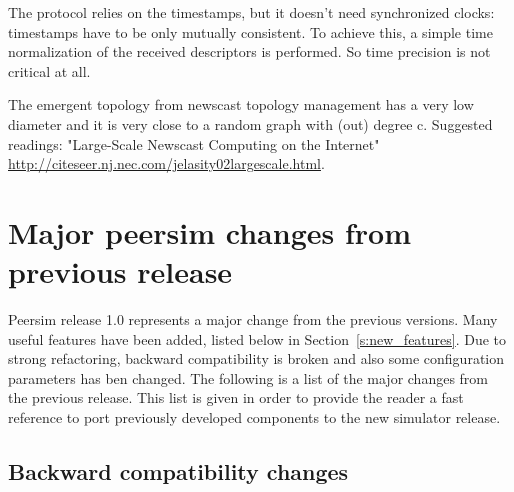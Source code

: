 \documentclass[a4paper,11pt]{article}
\begin{document}
The protocol relies on the timestamps, but it doesn't need synchronized
clocks: timestamps have to be only mutually consistent. To achieve
this, a simple time normalization of the received descriptors is performed.
So time precision is not critical at all. 

The emergent topology from newscast topology management has a very
low diameter and it is very close to a random graph with (out) degree
c. Suggested readings: "Large-Scale Newscast Computing on the Internet" \url{http://citeseer.nj.nec.com/jelasity02largescale.html}.

\section{\label{sec:Appendix-C-changes} Major peersim changes from
  previous release}

Peersim release 1.0 represents a major change from the previous
versions. 
Many useful features have been added, listed below in
Section~\ref{s:new_features}.    
Due to strong refactoring, backward compatibility is broken and also
some configuration parameters has ben changed. 
The following is a list of the major changes from the previous
release. This list is given in order to provide the reader a fast reference to
port previously developed components to the new simulator release.

\subsection{Backward compatibility changes}
\label{s:comp_change}
\end{document}
